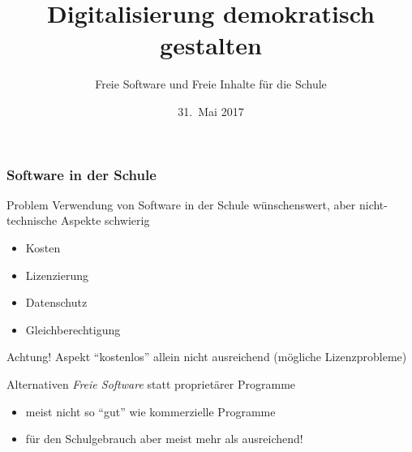 \documentclass{beamer}
\date{31.~Mai 2017}
\begin{document}
\title{Digitalisierung demokratisch gestalten}
\subtitle{Freie Software und Freie Inhalte für die Schule}

\maketitle

\begin{frame}
  \frametitle{Software in der Schule}

  \onslide<+->

  \begin{block}{Problem}
    Verwendung von Software in der Schule wünschenswert, aber
    nicht-technische Aspekte schwierig
    \begin{itemize}
    \item Kosten
    \item Lizenzierung
    \item Datenschutz
    \item Gleichberechtigung
    \end{itemize}
  \end{block}

  \onslide<+->

  \begin{block}{Achtung!}
    Aspekt \enquote{kostenlos} allein nicht ausreichend (mögliche
    Lizenzprobleme)
  \end{block}

  \onslide<+->

  \begin{block}{Alternativen}
    \emph{Freie Software} statt proprietärer Programme
    \begin{itemize}
    \item meist nicht so \enquote{gut} wie kommerzielle Programme
    \item für den Schulgebrauch aber meist mehr als ausreichend!
    \end{itemize}
  \end{block}

\end{frame}
\end{document}
